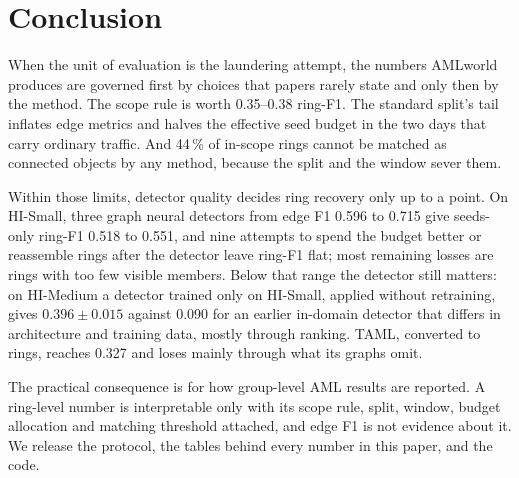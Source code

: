 \section{Conclusion}
\label{sec:conclusion}

When the unit of evaluation is the laundering attempt, the numbers AMLworld produces are
governed first by choices that papers rarely state and only then by the method. The scope rule
is worth 0.35--0.38 ring-F1. The standard split's tail inflates edge metrics and halves the
effective seed budget in the two days that carry ordinary traffic. And 44\,\% of in-scope
rings cannot be matched as connected objects by any method, because the split and the window
sever them.

Within those limits, detector quality decides ring recovery only up to a point. On HI-Small,
three graph neural detectors from edge F1 0.596 to 0.715 give seeds-only ring-F1 0.518 to 0.551,
and nine attempts to spend the budget better or reassemble rings after the detector leave
ring-F1 flat; most remaining losses are rings with too few visible members. Below that range the
detector still matters: on HI-Medium a detector trained only on HI-Small, applied without
retraining, gives $0.396 \pm 0.015$ against 0.090 for an earlier in-domain detector that differs
in architecture and training data, mostly through ranking. TAML, converted to rings, reaches
0.327 and loses mainly through what its graphs omit.

The practical consequence is for how group-level AML results are reported. A ring-level number
is interpretable only with its scope rule, split, window, budget allocation and matching
threshold attached, and edge F1 is not evidence about it. We release the protocol, the tables
behind every number in this paper, and the code.
